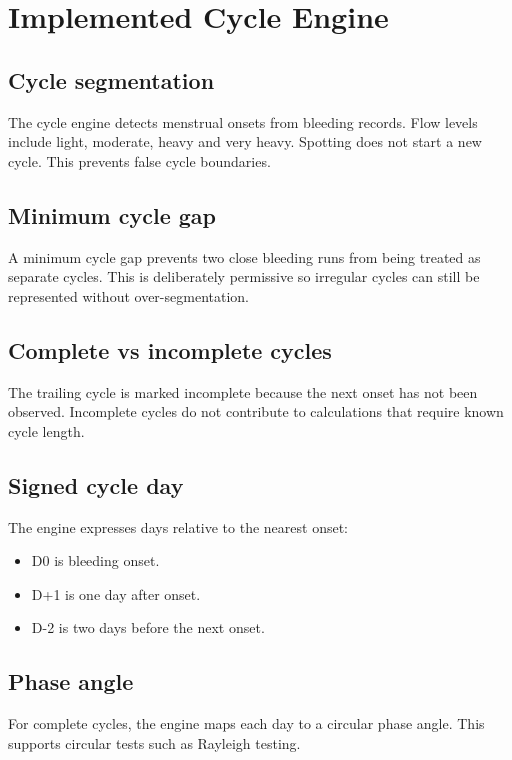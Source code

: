 \documentclass[11pt,a4paper]{article}
\begin{document}
\section{Implemented Cycle Engine}

\subsection{Cycle segmentation}

The cycle engine detects menstrual onsets from bleeding records. Flow levels include light, moderate, heavy and very heavy. Spotting does not start a new cycle. This prevents false cycle boundaries.

\subsection{Minimum cycle gap}

A minimum cycle gap prevents two close bleeding runs from being treated as separate cycles. This is deliberately permissive so irregular cycles can still be represented without over-segmentation.

\subsection{Complete vs incomplete cycles}

The trailing cycle is marked incomplete because the next onset has not been observed. Incomplete cycles do not contribute to calculations that require known cycle length.

\subsection{Signed cycle day}

The engine expresses days relative to the nearest onset:

\begin{itemize}
  \item D0 is bleeding onset.
  \item D+1 is one day after onset.
  \item D-2 is two days before the next onset.
\end{itemize}

\subsection{Phase angle}

For complete cycles, the engine maps each day to a circular phase angle. This supports circular tests such as Rayleigh testing.
\end{document}
